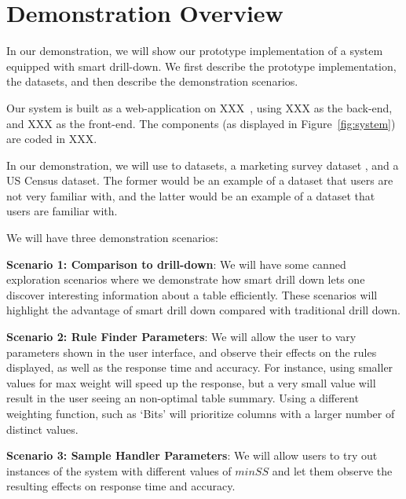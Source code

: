 
\section{Demonstration Overview} \label{sec:demo} 
In our demonstration, we will show our prototype implementation of a system equipped with smart drill-down. We first describe the prototype implementation, the datasets, and then describe the demonstration scenarios.

  Our system is built as a web-application on XXX~\cite{XXX}, using XXX as the back-end, and XXX as the front-end. The components (as displayed in Figure~\ref{fig:system}) are coded in XXX. 

 In our demonstration, we will use to datasets,
a marketing survey dataset , and a
US Census dataset. 
The former would be an example of a dataset that users are not very familiar with,
and the latter would be an example of a dataset that users are familiar with.


 We will have three demonstration scenarios:
\squishlist
\item {\bf Scenario 1: Comparison to drill-down}: We will have some canned exploration scenarios   where we demonstrate how smart drill down lets one discover interesting information about a table efficiently. These scenarios will highlight the advantage of smart drill down compared with traditional drill down. 
\item {\bf Scenario 2: Rule Finder Parameters}: We will allow the user to vary parameters shown in the user interface, and observe their effects on the rules displayed, as well as the response time and accuracy.  For instance, using smaller values for max weight will speed up the response, but a very small value will result in the user seeing an non-optimal table summary. Using a different weighting function, such as `Bits'  will prioritize columns with a larger number of distinct values.
\item {\bf Scenario 3: Sample Handler Parameters}:  We will allow users to try out instances of the system with different values of $minSS$ and let them observe the resulting effects on response time and accuracy.
\squishend
{}